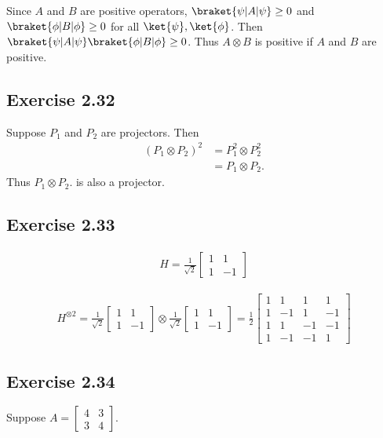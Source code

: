 \documentclass[a4paper,12pt]{article}
\begin{document}
Since $A$ and $B$ are positive operators,
$\braket{\psi |A| \psi} \geq 0$ and $\braket{\phi | B | \phi} \geq 0$ for all $\ket{\psi}, \ket{\phi} $.
Then $\braket{\psi |A| \psi} \braket{\phi | B | \phi} \geq 0$.
Thus $A \otimes B$ is positive if $A$ and $B$ are positive.


\subsection*{Exercise 2.32}
Suppose $P_1$ and $P_2$  are projectors. Then
\begin{align*}
	(P_1 \otimes P_2) ^2 &= P_1^2 \otimes P_2^2\\
		&= P_1 \otimes P_2.
\end{align*}
Thus $ P_1 \otimes P_2.$ is also a projector.


\subsection*{Exercise 2.33}
\begin{align}
	H  = \frac{1}{\sqrt{2}} \begin{bmatrix}
		1 & 1 \\
		1 & -1
	\end{bmatrix}
\end{align}

\begin{align*}
	H^{\otimes 2}
	=
	\frac{1}{\sqrt{2}} \begin{bmatrix}
	1 & 1 \\
	1 & -1
	\end{bmatrix}
	\otimes
	\frac{1}{\sqrt{2}} \begin{bmatrix}
	1 & 1 \\
	1 & -1
	\end{bmatrix}
	=
	\frac{1}{2} \begin{bmatrix}
		1 & 1 & 1 & 1 \\
		1 & -1 & 1 & -1 \\
		1 & 1 & -1 & -1 \\
		1 & -1 & -1 & 1
	\end{bmatrix}
\end{align*}



\subsection*{Exercise 2.34}
Suppose $A = \begin{bmatrix}
4 & 3 \\
3 & 4
\end{bmatrix} $.
\end{document}
